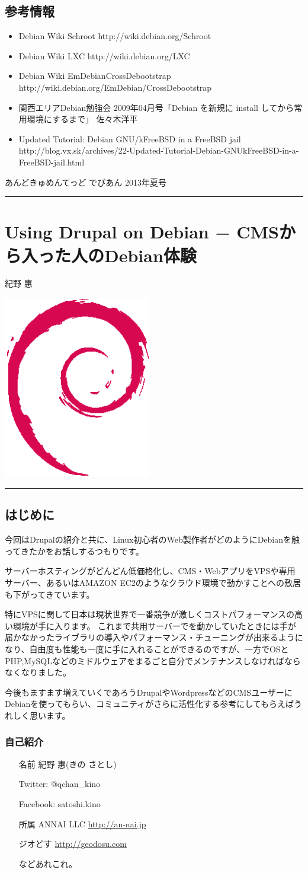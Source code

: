 \documentclass[mingoth,a4paper]{jsarticle}
\renewcommand{\dancersection}[2]{%
\newpage
あんどきゅめんてっど でびあん 2013年夏号
%
\vspace{0.1mm}\\
{\color{dancerdarkblue}\rule{\hsize}{2mm}}

%
%
\begin{minipage}[t]{0.6\hsize}
\color{dancerdarkblue}
\vspace{1cm}
\section{#1}
\hfill{}#2\\
\end{minipage}
\begin{minipage}[t]{0.4\hsize}
\vspace{-2cm}
\hfill{}\includegraphics[height=8cm]{image200502/openlogo-nd.eps}\\
\vspace{-5cm}
\end{minipage}
%
{\color{dancerlightblue}\rule{0.66\hsize}{2mm}}
%
\vspace{2cm}
}
\begin{document}
\subsection{参考情報}

\begin{itemize}
  \item{Debian Wiki Schroot http://wiki.debian.org/Schroot}
  \item{Debian Wiki LXC http://wiki.debian.org/LXC}
  \item{Debian Wiki EmDebianCrossDebootstrap http://wiki.debian.org/EmDebian/CrossDebootstrap}
  \item{関西エリアDebian勉強会 2009年04月号「Debian を新規に install してから常用環境にするまで」 佐々木洋平}
  \item{Updated Tutorial: Debian GNU/kFreeBSD in a FreeBSD jail  http://blog.vx.sk/archives/22-Updated-Tutorial-Debian-GNUkFreeBSD-in-a-FreeBSD-jail.html}
\end{itemize}

\dancersection{Using Drupal on Debian − CMSから入った人のDebian体験}{紀野 惠}

\subsection{はじめに}

今回はDrupalの紹介と共に、Linux初心者のWeb製作者がどのようにDebianを触ってきたかをお話しするつもりです。

サーバーホスティングがどんどん低価格化し、CMS・WebアプリをVPSや専用サーバー、あるいはAMAZON EC2のようなクラウド環境で動かすことへの敷居も下がってきています。

特にVPSに関して日本は現状世界で一番競争が激しくコストパフォーマンスの高い環境が手に入ります。
これまで共用サーバーでを動かしていたときには手が届かなかったライブラリの導入やパフォーマンス・チューニングが出来るようになり、自由度も性能も一度に手に入れることができるのですが、一方でOSとPHP,MySQLなどのミドルウェアをまるごと自分でメンテナンスしなければならなくなりました。

今後もますます増えていくであろうDrupalやWordpressなどのCMSユーザーにDebianを使ってもらい、コミュニティがさらに活性化する参考にしてもらえばうれしく思います。

\subsubsection{自己紹介}
\begin{itemize}
\item[名前] 紀野 惠(きの さとし)

  Twitter: @qchan\_kino

  Facebook: satoshi.kino

\item[所属] ANNAI LLC \url{http://an-nai.jp}

  ジオどす \url{http://geodosu.com}

  などあれこれ。
\end{itemize}
\end{document}
